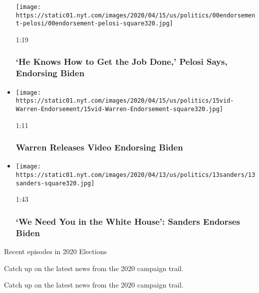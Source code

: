 \begin{itemize}
  \texttt{[image: https://static01.nyt.com/images/2020/04/15/us/politics/00endorsement-pelosi/00endorsement-pelosi-square320.jpg]}

  1:19

  \hypertarget{he-knows-how-to-get-the-job-done-pelosi-says-endorsing-biden}{%
  \subsubsection{`He Knows How to Get the Job Done,' Pelosi Says,
  Endorsing
  Biden}\label{he-knows-how-to-get-the-job-done-pelosi-says-endorsing-biden}}
\item
  \href{https://www.nytimes.com/video/us/politics/100000007089056/warren-releases-video-endorsing-biden.html?action=click\&module=video-series-bar\&region=header\&pgtype=Article\&playlistId=video/2020-Elections}{}

  \texttt{[image: https://static01.nyt.com/images/2020/04/15/us/politics/15vid-Warren-Endorsement/15vid-Warren-Endorsement-square320.jpg]}

  1:11

  \hypertarget{warren-releases-video-endorsing-biden}{%
  \subsubsection{Warren Releases Video Endorsing
  Biden}\label{warren-releases-video-endorsing-biden}}
\item
  \href{https://www.nytimes.com/video/us/politics/100000007085637/sanders-endorses-biden.html?action=click\&module=video-series-bar\&region=header\&pgtype=Article\&playlistId=video/2020-Elections}{}

  \texttt{[image: https://static01.nyt.com/images/2020/04/13/us/politics/13sanders/13sanders-square320.jpg]}

  1:43

  \hypertarget{we-need-you-in-the-white-house-sanders-endorses-biden}{%
  \subsubsection{`We Need You in the White House': Sanders Endorses
  Biden}\label{we-need-you-in-the-white-house-sanders-endorses-biden}}
\end{itemize}

Recent episodes in 2020 Elections

Catch up on the latest news from the 2020 campaign trail.

Catch up on the latest news from the 2020 campaign trail.

